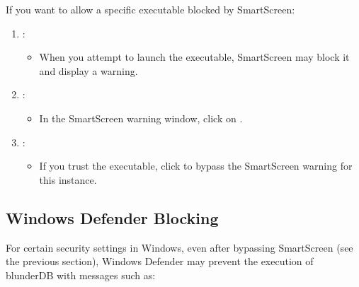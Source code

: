 \documentclass[letterpaper,10pt,english]{sphinxmanual}
\begin{document}
\begin{figure}[htbp]
\centering

\noindent{}
\end{figure}

\sphinxAtStartPar
If you want to allow a specific executable blocked by SmartScreen:
\begin{enumerate}
%
\item {} 
\sphinxAtStartPar
{}:
\begin{itemize}
\item {} 
\sphinxAtStartPar
When you attempt to launch the executable, SmartScreen may block it and display a warning.

\end{itemize}

\item {} 
\sphinxAtStartPar
{}:
\begin{itemize}
\item {} 
\sphinxAtStartPar
In the SmartScreen warning window, click on .

\end{itemize}

\item {} 
\sphinxAtStartPar
{}:
\begin{itemize}
\item {} 
\sphinxAtStartPar
If you trust the executable, click  to bypass the SmartScreen warning for this instance.

\end{itemize}

\end{enumerate}


\subsection{Windows Defender Blocking}
\label{\detokenize{annexe_windows_securite:blocage-windows-defender}}
\sphinxAtStartPar
For certain security settings in Windows, even after bypassing SmartScreen (see the previous section), Windows Defender may prevent the execution of blunderDB with messages such as:

\begin{figure}[htbp]
\centering

\noindent{}
\end{figure}
\end{document}
